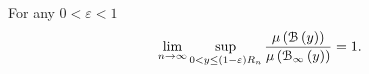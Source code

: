 \begin{lemma}\label{lem:average_degree_hyperbolic}
For any $0 < \varepsilon < 1$
\[
	\lim_{n \to \infty} \sup_{0 < y \le (1-\varepsilon)R_n} \frac{\mu\left({\mathcal B}\left(y\right)\right)}{\mu\left({\mathcal B}_{\infty}\left(y\right)\right)} = 1.
\]
\end{lemma}

